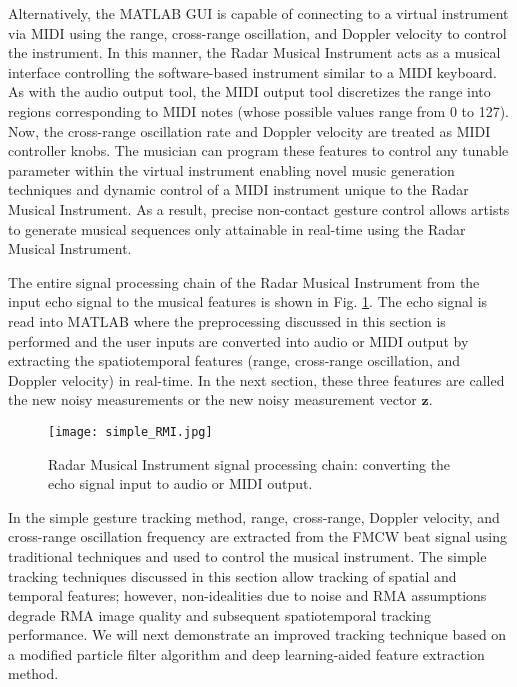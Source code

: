 \documentclass[10pt,journal,final]{IEEEtran}
\begin{document}
Alternatively, the MATLAB GUI is capable of connecting to a virtual instrument via MIDI using the range, cross-range oscillation, and Doppler velocity to control the instrument. In this manner, the Radar Musical Instrument acts as a musical interface controlling the software-based instrument similar to a MIDI keyboard. As with the audio output tool, the MIDI output tool discretizes the range into regions corresponding to MIDI notes (whose possible values range from 0 to 127). Now, the cross-range oscillation rate and Doppler velocity are treated as MIDI controller knobs. The musician can program these features to control any tunable parameter within the virtual instrument enabling novel music generation techniques and dynamic control of a MIDI instrument unique to the Radar Musical Instrument. As a result, precise non-contact gesture control allows artists to generate musical sequences only attainable in real-time using the Radar Musical Instrument.

The entire signal processing chain of the Radar Musical Instrument from the input echo signal to the musical features is shown in Fig. \ref{fig:simple_signal_chain}. The echo signal is read into MATLAB where the preprocessing discussed in this section is performed and the user inputs are converted into audio or MIDI output by extracting the spatiotemporal features (range, cross-range oscillation, and Doppler velocity) in real-time. In the next section, these three features are called the new noisy measurements or the new noisy measurement vector $\bm{z}$.

\begin{figure}[h]
	\centering
	\texttt{[image: simple\_RMI.jpg]}
	\caption{Radar Musical Instrument signal processing chain: converting the echo signal input to audio or MIDI output.}
	\label{fig:simple_signal_chain}
\end{figure}

In the simple gesture tracking method, range, cross-range, Doppler velocity, and cross-range oscillation frequency are extracted from the FMCW beat signal using traditional techniques and used to control the musical instrument. The simple tracking techniques discussed in this section allow tracking of spatial and temporal features; however, non-idealities due to noise and RMA assumptions degrade RMA image quality and subsequent spatiotemporal tracking performance. We will next demonstrate an improved tracking technique based on a modified particle filter algorithm and deep learning-aided feature extraction method.
\end{document}
